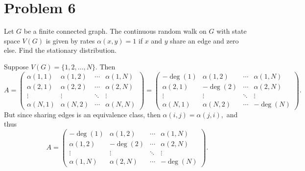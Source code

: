 \documentclass[11pt]{article}
\begin{document}
\section*{Problem 6}
\begin{problem}
    Let $G$ be a finite connected graph. The continuous random walk on $G$ with state space $V(G)$ is given by rates $\alpha(x,y) = 1$ if $x$ and $y$ share an edge and zero else. Find the stationary distribution.
\end{problem}
\begin{solution}
    Suppose $V(G) = \{1,2,\dots, N\}.$ Then 
    \[A = \begin{pmatrix}
        \alpha(1,1) & \alpha(1,2) & \cdots & \alpha(1,N)\\
        \alpha(2,1) & \alpha(2,2) & \cdots & \alpha(2,N)\\
    \vdots & \vdots &\ddots & \vdots\\
    \alpha(N,1) & \alpha(N,2) & \cdots & \alpha(N,N)
    \end{pmatrix} = \begin{pmatrix}
        -\deg(1) & \alpha(1,2) & \cdots & \alpha(1,N)\\
        \alpha(2,1) & -\deg(2) & \cdots & \alpha(2,N)\\
    \vdots & \vdots &\ddots & \vdots\\
    \alpha(N,1) & \alpha(N,2) & \cdots & -\deg(N)
    \end{pmatrix}.\] But since sharing edges is an equivalence class, then $\alpha(i,j) = \alpha(j,i),$ and thus 
    \[A = \begin{pmatrix}
        -\deg(1) & \alpha(1,2) & \cdots & \alpha(1,N)\\
        \alpha(1,2) & -\deg(2) & \cdots & \alpha(2,N)\\
    \vdots & \vdots &\ddots & \vdots\\
    \alpha(1,N) & \alpha(2,N) & \cdots & -\deg(N)
    \end{pmatrix}.\]
    

\end{solution}
\end{document}
